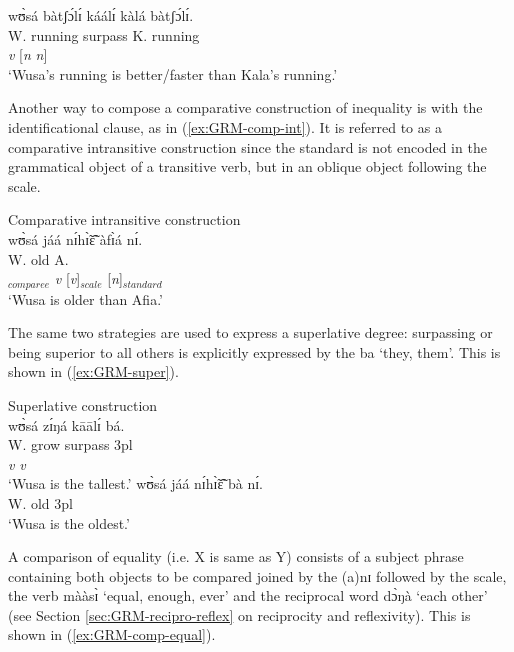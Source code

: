 \ex\label{ex:GRM-comp-tr-sca-abs}{
\glll wʊ̀sá bàtʃɔ́lɪ́ káálɪ́ kàlá bàtʃɔ́lɪ́.\\
W.  running surpass K. running\\
[{\it n}  {\it n}]  {\it v} [{\it n} {\it n}]\\
\glt `Wusa's running is better/faster than Kala's running.'
}

\z 
 \z

Another way to compose a comparative construction of inequality is with the
identificational clause, as in (\ref{ex:GRM-comp-int}).  It is referred to as a comparative intransitive construction since the standard is not encoded in the grammatical object of a transitive verb, but in an oblique object following the scale.


\ea\label{ex:GRM-comp-int}{\rm Comparative intransitive construction}\\

\glll wʊ̀sá jáá nɪ́hɪ̃̀ɛ̃̂ àfɪ̀á nɪ́.\\
W.  {\ident} old A. {\postp}\\
[{\it n}]$_{comparee}$   {\it v} [{\it v}]$_{scale}$  [{\it n}]$_{standard}$  
{}\\
\glt `Wusa is older than Afia.'
\z

The same  two strategies are used to
express a superlative degree: surpassing or being superior to all others is
explicitly expressed by the  {\sls ba} `they, them'.
This is shown in (\ref{ex:GRM-super}).


\ea\label{ex:GRM-super}{\rm Superlative construction}\\

\ea
\glll wʊ̀sá zɪ́ŋá kāālɪ́ bá.\\
W. grow surpass {\sc 3pl}\\
{} {\it v} {\it v} {}\\
\glt  `Wusa is the tallest.'
\ex 
\gll wʊ̀sá jáá nɪ́hɪ̃̀ɛ̃̂ bà nɪ́.\\
W. {\ident} old {\sc 3pl} {\postp}\\
\glt  `Wusa is the oldest.'

\z 
 \z
 
 
A comparison of equality (i.e. X is same as Y) consists of a subject phrase containing both objects to be  compared joined by the   {\sls (a)nɪ} followed by the scale, the verb {\sls mààsɪ̀} `equal, enough, ever' and the reciprocal word {\sls dɔ̀ŋà} `each other'  (see Section \ref{sec:GRM-recipro-reflex} on reciprocity and reflexivity). This is shown in (\ref{ex:GRM-comp-equal}).

